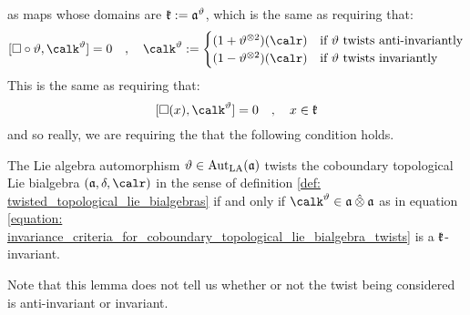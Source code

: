         as maps whose domains are $\mathfrak{k} := \mathfrak{a}^{\vartheta}$, which is the same as requiring that:
            \begin{equation} \label{equation: invariance_criteria_for_coboundary_topological_lie_bialgebra_twists}
                [\Box \circ \vartheta, \calk^{\vartheta}] = 0
                \quad, \quad
                \calk^{\vartheta} :=
                \begin{cases}
                    (1 + \vartheta^{\tensor 2})(\calr) & \text{if $\vartheta$ twists anti-invariantly}
                    \\
                    (1 - \vartheta^{\tensor 2})(\calr) & \text{if $\vartheta$ twists invariantly}
                \end{cases}
            \end{equation}
        This is the same as requiring that:
            $$[ \Box(x), \calk^{\vartheta} ] = 0 \quad, \quad x \in \k$$
        and so really, we are requiring the that the following condition holds.
        \begin{lemma} \label{lemma: invariance_criteria_for_coboundary_topological_lie_bialgebra_twists}
            The Lie algebra automorphism $\vartheta \in \operatorname{Aut}_{\mathrm{LA}}(\mathfrak{a})$ twists the coboundary topological Lie bialgebra $(\a, \delta, \calr)$ in the sense of definition \ref{def: twisted_topological_lie_bialgebras} if and only if $\calk^{\vartheta} \in \a \hattensor \a$ as in equation \eqref{equation: invariance_criteria_for_coboundary_topological_lie_bialgebra_twists} is a $\mathfrak{k}$-invariant.
        \end{lemma}
        Note that this lemma does not tell us whether or not the twist being considered is anti-invariant or invariant.
        
